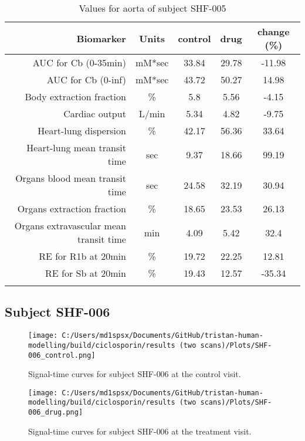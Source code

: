 \documentclass{epflreport}%
\begin{document}
\begin{longtable}{rcccc}%
\hline%
Biomarker&Units&control&drug&change (\%)\\%
\hline%
AUC for Cb (0{-}35min)&mM*sec&33.84&29.78&{-}11.98\\%
AUC for Cb (0{-}inf)&mM*sec&43.72&50.27&14.98\\%
Body extraction fraction&\%&5.8&5.56&{-}4.15\\%
Cardiac output&L/min&5.34&4.82&{-}9.75\\%
Heart{-}lung dispersion&\%&42.17&56.36&33.64\\%
Heart{-}lung mean transit time&sec&9.37&18.66&99.19\\%
Organs blood mean transit time&sec&24.58&32.19&30.94\\%
Organs extraction fraction&\%&18.65&23.53&26.13\\%
Organs extravascular mean transit time&min&4.09&5.42&32.4\\%
RE for R1b at 20min&\%&19.72&22.25&12.81\\%
RE for Sb at 20min&\%&19.43&12.57&{-}35.34\\%
\hline%
\caption{Values for aorta of subject SHF-005} \\%
\end{longtable}%
\clearpage%
\subsection{Subject SHF{-}006}%
\label{subsec:SubjectSHF{-}006}%

%


\begin{figure}[h!]%
\centering%
\texttt{[image: C:/Users/md1spsx/Documents/GitHub/tristan-human-modelling/build/ciclosporin/results (two scans)/Plots/SHF-006\_control.png]}%
\caption{Signal{-}time curves for subject SHF{-}006 at the control visit.}%
\end{figure}

%


\begin{figure}[h!]%
\centering%
\texttt{[image: C:/Users/md1spsx/Documents/GitHub/tristan-human-modelling/build/ciclosporin/results (two scans)/Plots/SHF-006\_drug.png]}%
\caption{Signal{-}time curves for subject SHF{-}006 at the treatment visit.}%
\end{figure}
\end{document}
